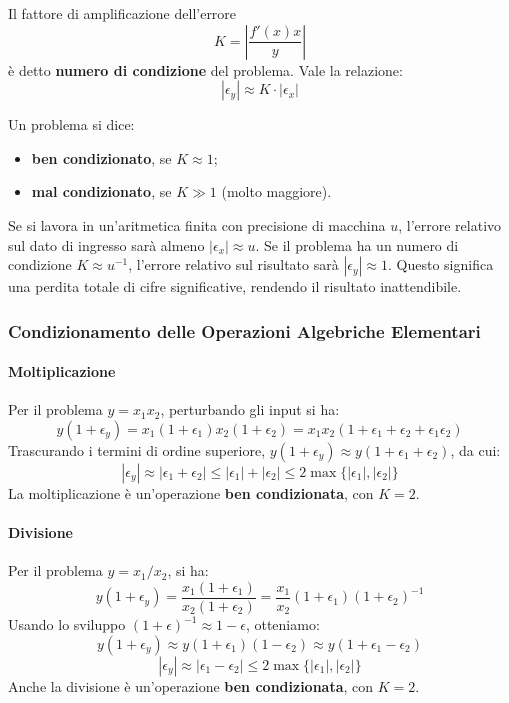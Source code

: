 \begin{definition}
Il fattore di amplificazione dell'errore
$$ K = \left| \frac{f'(x)x}{y} \right| $$
è detto \textbf{numero di condizione} del problema. Vale la relazione:
$$ |\epsilon_y| \approx K \cdot |\epsilon_x| $$
\end{definition}

Un problema si dice:
\begin{itemize}
    \item \textbf{ben condizionato}, se $K \approx 1$;
    \item \textbf{mal condizionato}, se $K \gg 1$ (molto maggiore).
\end{itemize}

\begin{osservazione}
Se si lavora in un'aritmetica finita con precisione di macchina $u$, l'errore relativo sul dato di ingresso sarà almeno $|\epsilon_x| \approx u$. Se il problema ha un numero di condizione $K \approx u^{-1}$, l'errore relativo sul risultato sarà $|\epsilon_y| \approx 1$. Questo significa una perdita totale di cifre significative, rendendo il risultato inattendibile.
\end{osservazione}

\subsubsection*{Condizionamento delle Operazioni Algebriche Elementari}

\paragraph{Moltiplicazione}
Per il problema $y = x_1 x_2$, perturbando gli input si ha:
$$ y(1+\epsilon_y) = x_1(1+\epsilon_1) x_2(1+\epsilon_2) = x_1 x_2 (1 + \epsilon_1 + \epsilon_2 + \epsilon_1 \epsilon_2) $$
Trascurando i termini di ordine superiore, $y(1+\epsilon_y) \approx y(1+\epsilon_1+\epsilon_2)$, da cui:
$$ |\epsilon_y| \approx |\epsilon_1 + \epsilon_2| \le |\epsilon_1| + |\epsilon_2| \le 2 \max\{|\epsilon_1|, |\epsilon_2|\} $$
La moltiplicazione è un'operazione \textbf{ben condizionata}, con $K=2$.

\paragraph{Divisione}
Per il problema $y = x_1 / x_2$, si ha:
$$ y(1+\epsilon_y) = \frac{x_1(1+\epsilon_1)}{x_2(1+\epsilon_2)} = \frac{x_1}{x_2}(1+\epsilon_1)(1+\epsilon_2)^{-1} $$
Usando lo sviluppo $(1+\epsilon)^{-1} \approx 1 - \epsilon$, otteniamo:
$$ y(1+\epsilon_y) \approx y(1+\epsilon_1)(1-\epsilon_2) \approx y(1+\epsilon_1 - \epsilon_2) $$
$$ |\epsilon_y| \approx |\epsilon_1 - \epsilon_2| \le 2 \max\{|\epsilon_1|, |\epsilon_2|\} $$
Anche la divisione è un'operazione \textbf{ben condizionata}, con $K=2$.

